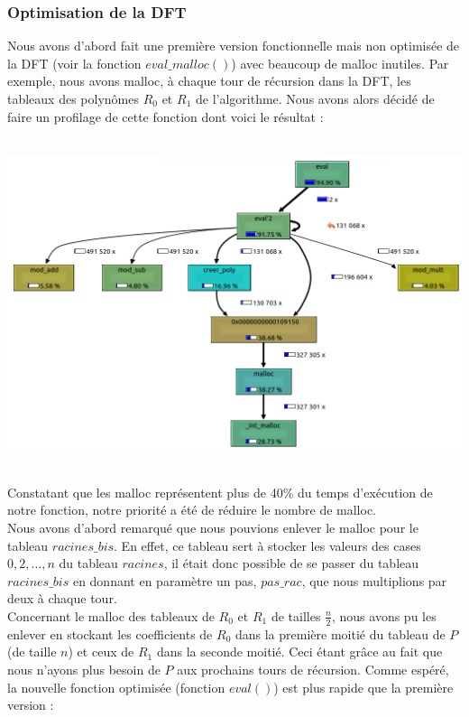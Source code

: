 \documentclass[12pt, a4paper]{article}
\begin{document}
\subsubsection{Optimisation de la DFT}
Nous avons d'abord fait une première version fonctionnelle mais non optimisée de la DFT (voir la fonction $eval\_malloc()$) avec beaucoup de malloc inutiles. Par exemple, nous avons malloc, à chaque tour de récursion dans la DFT, les tableaux des polynômes $R_0$ et $R_1$ de l'algorithme. Nous avons alors décidé de faire un profilage de cette fonction dont voici le résultat : \\ \\
\centerline{\includegraphics[scale=0.7]{profiler_eval_malloc}}
{}
\ \\
\indent Constatant que les malloc représentent plus de  40\% du temps d'exécution de notre fonction, notre priorité a été de réduire le nombre de malloc.  \\
\indent Nous avons d'abord remarqué que nous pouvions enlever le malloc pour le tableau \linebreak $racines\_bis$. En effet, ce tableau sert à stocker les valeurs des cases $0,2,\dots,n$ du tableau $racines$, il était donc possible de se passer du tableau $racines\_bis$ en donnant en paramètre un pas, $pas\_rac$, que nous multiplions par deux à chaque tour. \\
\indent Concernant le malloc des tableaux de $R_0$ et $R_1$ de tailles $\frac{n}{2}$, nous avons pu les enlever en stockant les coefficients de $R_0$ dans la première moitié du tableau de $P$ (de taille $n$) et ceux de $R_1$ dans la seconde moitié. Ceci étant grâce au fait que nous n'ayons plus besoin de $P$ aux prochains tours de récursion.
Comme espéré, la nouvelle fonction optimisée (fonction $eval()$) est plus rapide que la première version :
\end{document}
